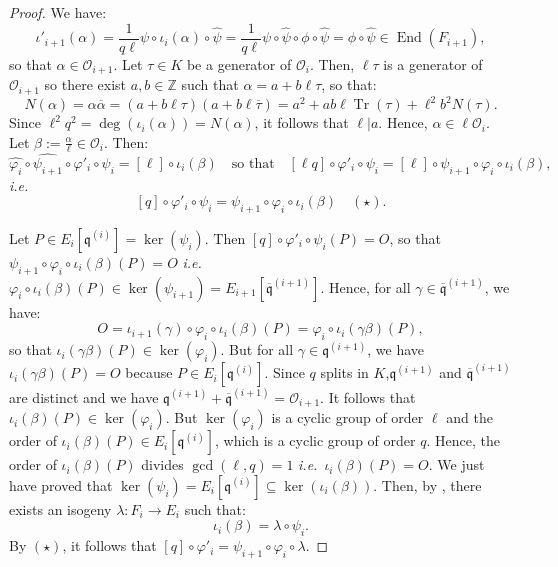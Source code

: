 \documentclass[a4paper,10pt,notitlepage]{report}
\theoremstyle{definition}
\theoremstyle{plain}
\theoremstyle{definition}
\newcommand{\ie}{\emph{i.e.}\ }
\newcommand{\Z}{\mathbb{Z}}
\newcommand{\mO}{\mathcal{O}}
\renewcommand{\(}{\left(}
\renewcommand{\)}{\right)}
\newcommand{\mfq}{\mathfrak{q}}
\DeclareMathOperator{\End}{End}
\DeclareMathOperator{\Tr}{Tr}
\begin{document}
\begin{proof}
We have:
\[\iota'_{i+1}(\alpha)=\frac{1}{q\ell}\psi\circ\iota_i(\alpha)\circ\widehat{\psi}=\frac{1}{q\ell}\psi\circ \widehat{\psi}\circ\phi\circ\widehat{\psi}=\phi\circ\widehat{\psi}\in \End(F_{i+1}),\]
so that $\alpha\in \mO_{i+1}$. Let $\tau\in K$ be a generator of $\mO_i$. Then, $\ell\tau$ is a generator of $\mO_{i+1}$ so there exist $a,b\in\Z$ such that $\alpha=a+b\ell\tau$, so that:
\[N(\alpha)=\alpha\overline{\alpha}=(a+b\ell\tau)(a+b\ell\overline{\tau})=a^2+ab\ell\Tr(\tau)+\ell^2b^2N(\tau).\]
Since $\ell^2q^2=\deg(\iota_i(\alpha))=N(\alpha)$, it follows that $\ell|a$. Hence, $\alpha\in\ell\mO_i$.  Let $\beta:=\frac{\alpha}{\ell}\in\mO_i$.  Then:
\[\widehat{\varphi_i}\circ\widehat{\psi_{i+1}}\circ\varphi'_i\circ\psi_i=[\ell]\circ\iota_i(\beta)\quad\mbox{so that} \quad [\ell q]\circ\varphi'_i\circ\psi_i=[\ell]\circ\psi_{i+1}\circ\varphi_i\circ\iota_i(\beta),\]
\ie
\[[q]\circ\varphi'_i\circ\psi_i=\psi_{i+1}\circ\varphi_i\circ\iota_i(\beta)\quad (\star).\]

Let $P\in E_i[\mfq^{(i)}]=\ker(\psi_i)$.  Then $[q]\circ\varphi'_i\circ\psi_i(P)=O$, so that $\psi_{i+1}\circ\varphi_i\circ\iota_i(\beta)(P)=O$ \ie $\varphi_i\circ\iota_i(\beta)(P)\in\ker(\psi_{i+1})=E_{i+1}[\overline{\mfq}^{(i+1)}]$. Hence, for all $\gamma\in\overline{\mfq}^{(i+1)}$, we have:
\[O=\iota_{i+1}(\gamma)\circ\varphi_i\circ\iota_i(\beta)(P)=\varphi_i\circ\iota_i(\gamma\beta)(P),\]
so that $\iota_i(\gamma\beta)(P)\in\ker(\varphi_i)$. But for all $\gamma\in\mfq^{(i+1)}$, we have $\iota_i(\gamma\beta)(P)=O$ because $P\in E_i[\mfq^{(i)}]$.  Since $q$ splits in $K$,$\mfq^{(i+1)}$ and $\overline{\mfq}^{(i+1)}$ are distinct and we have $\mfq^{(i+1)}+\overline{\mfq}^{(i+1)}=\mO_{i+1}$. It follows that $\iota_i(\beta)(P)\in\ker(\varphi_i)$. But $\ker(\varphi_i)$ is a cyclic group of order $\ell$ and the order of $\iota_i(\beta)(P)\in E_i[\mfq^{(i)}]$, which is a cyclic group of order $q$. Hence, the order of $\iota_i(\beta)(P)$ divides $\gcd(\ell,q)=1$ \ie $\iota_i(\beta)(P)=O$.  We just have proved that $\ker(\psi_i)=E_i[\mfq^{(i)}]\subseteq\ker(\iota_i(\beta))$. Then, by \cite[Corollary III.4.11]{Silverman1}, there exists an isogeny $\lambda : F_i\longrightarrow E_i$ such that: 
\[\iota_i(\beta)=\lambda\circ\psi_i.\]
By $(\star)$,  it follows that $[q]\circ\varphi'_i=\psi_{i+1}\circ\varphi_i\circ\lambda$. 


\end{proof}
\end{document}
